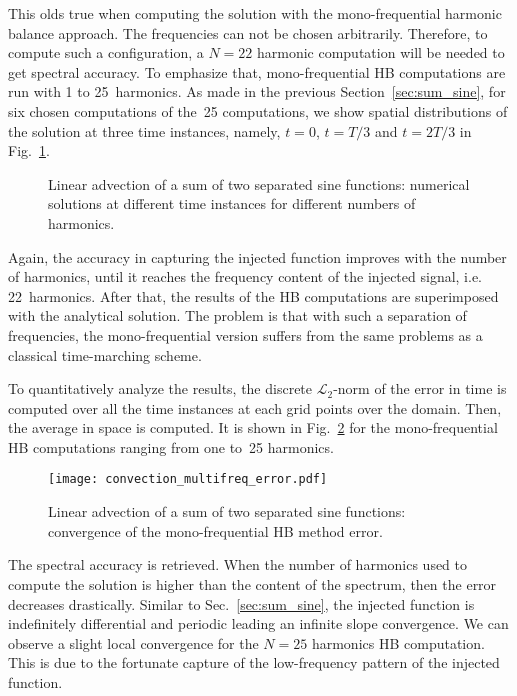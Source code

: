 This olds true when computing the solution with the mono-frequential
harmonic balance approach. The frequencies can not be chosen arbitrarily.
Therefore, to compute such a configuration, a $N=22$ harmonic computation
will be needed to get spectral accuracy. To emphasize that, mono-frequential
HB computations are run with 1 to 25~harmonics.
As made in the previous Section~\ref{sec:sum_sine}, 
for six chosen computations of the~25 computations, 
we show spatial distributions of the solution
at three time instances, namely, $t=0$, $t=T/3$ and $t=2T/3$
in Fig.~\ref{fig:inj_multifreq_tsm}.
\begin{figure}[htb]
  \centering
  \caption{Linear advection of a sum of two separated sine functions: 
  numerical solutions at different time instances for different numbers of harmonics.}
  \label{fig:inj_multifreq_tsm}
\end{figure}
Again, the accuracy in capturing the injected function
improves with the number of harmonics,
until it reaches the frequency content
of the injected signal, i.e. 22~harmonics.
After that, the results of the HB computations are
superimposed with the analytical solution. 
The problem is that with such a separation of frequencies,
the mono-frequential version suffers from the same
problems as a classical time-marching scheme.

To quantitatively analyze the results,
the discrete $\mathcal{L}_2$-norm of the error 
in time is computed over all the time instances
at each grid points over the domain.
Then, the average in space is computed.
It is shown in Fig.~\ref{fig:conv_multifreq_tsm} for the
mono-frequential HB computations ranging from one to~25
harmonics.
\begin{figure}[htb]
  \centering
  \texttt{[image: convection\_multifreq\_error.pdf]}
  \caption{Linear advection of a sum of two separated sine functions: convergence of the mono-frequential HB method error.}
  \label{fig:conv_multifreq_tsm}
\end{figure}
The spectral accuracy is retrieved. When the number of harmonics
used to compute the solution is higher than the content of the spectrum,
then the error decreases drastically. Similar to Sec.~\ref{sec:sum_sine},
the injected function is indefinitely differential and periodic
leading an infinite slope convergence. We can observe a slight local convergence
for the $N=25$ harmonics HB computation. This is due to the fortunate 
capture of the low-frequency pattern of the injected function.

